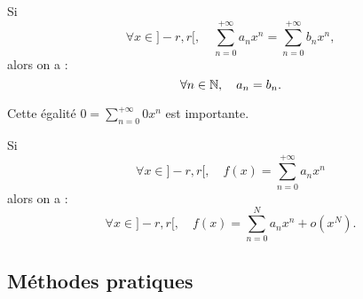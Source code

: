 \documentclass{book}
\begin{document}
\begin{Corollaire}
Si $$\forall x \in] - r, r [,\quad \sum_{n=0}^{+\infty} a_n x^n= \sum_{n=0}^{+\infty} b_n x^n,$$alors on a : $$\forall n\in \mathbb{N},\quad a_n=b_n.$$
\end{Corollaire}
\begin{Remarque}
Cette égalité $0=\sum_{n=0}^{+\infty} 0 x^n$ est importante.
\end{Remarque}

\begin{Corollaire}
Si $$\forall x \in] - r, r [,\quad f(x)=\sum_{n=0}^{+\infty} a_n x^n$$alors on a : $$\forall x \in] - r, r [,\quad f(x)=\sum_{n=0}^N a_n x^n+o(x^N).$$
\end{Corollaire}
\subsection{Méthodes pratiques}
\end{document}
